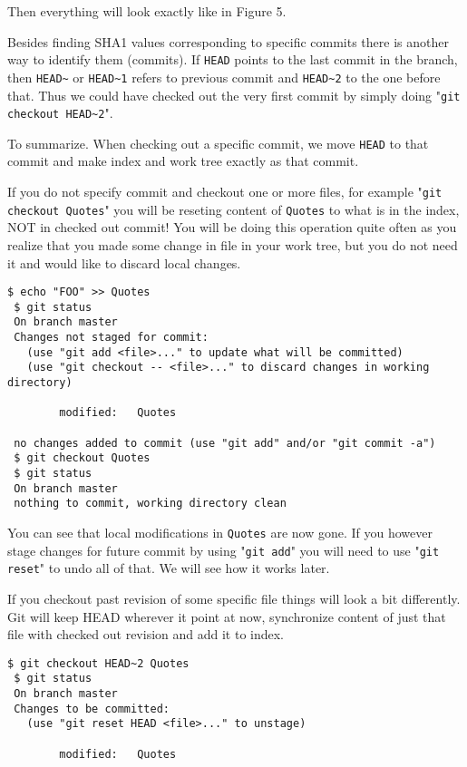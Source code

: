 \documentclass{article}
\theoremstyle{definition}
\begin{document}
        \noindent Then everything will look exactly like in Figure 5.

        Besides finding SHA1 values corresponding to specific commits there is another way to identify them (commits).
        If \texttt{HEAD} points to the last commit in the branch, then \texttt{HEAD\textasciitilde}
        or \texttt{HEAD\textasciitilde1} refers to previous commit and \texttt{HEAD\textasciitilde2} to the one before
        that. Thus we could have checked out the very first commit by simply
        doing "\texttt{git checkout HEAD\textasciitilde2}".

        To summarize. When checking out a specific commit, we move \texttt{HEAD} to that commit and make index and work
        tree exactly as that commit.

        If you do not specify commit and checkout one or more files, for example "\texttt{git checkout Quotes}" you
        will be reseting content of \texttt{Quotes} to what is in the index, NOT in checked out commit! You will be
        doing this operation quite often as you realize that you made some change in file in your work tree, but you do
        not need it and would like to discard local changes.

        \begin{Verbatim}[frame=single]
 $ echo "FOO" >> Quotes
 $ git status
 On branch master
 Changes not staged for commit:
   (use "git add <file>..." to update what will be committed)
   (use "git checkout -- <file>..." to discard changes in working directory)

        modified:   Quotes

 no changes added to commit (use "git add" and/or "git commit -a")
 $ git checkout Quotes
 $ git status
 On branch master
 nothing to commit, working directory clean
        \end{Verbatim}
        You can see that local modifications in \texttt{Quotes} are now gone. If you however stage changes for future
        commit by using "\texttt{git add}" you will need to use "\texttt{git reset}" to undo all of that. We will see
        how it works later.

        If you checkout past revision of some specific file things will look a bit differently. Git will keep HEAD
        wherever it point at now, synchronize content of just that file with checked out revision and add it to index.

        \begin{Verbatim}[frame=single]
 $ git checkout HEAD~2 Quotes
 $ git status
 On branch master
 Changes to be committed:
   (use "git reset HEAD <file>..." to unstage)

        modified:   Quotes
        \end{Verbatim}
\end{document}
